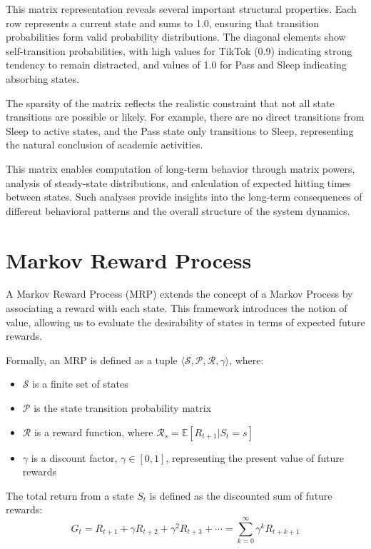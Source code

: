 This matrix representation reveals several important structural properties. Each row represents a current state and sums to 1.0, ensuring that transition probabilities form valid probability distributions. The diagonal elements show self-transition probabilities, with high values for TikTok (0.9) indicating strong tendency to remain distracted, and values of 1.0 for Pass and Sleep indicating absorbing states.

The sparsity of the matrix reflects the realistic constraint that not all state transitions are possible or likely. For example, there are no direct transitions from Sleep to active states, and the Pass state only transitions to Sleep, representing the natural conclusion of academic activities.

This matrix enables computation of long-term behavior through matrix powers, analysis of steady-state distributions, and calculation of expected hitting times between states. Such analyses provide insights into the long-term consequences of different behavioral patterns and the overall structure of the system dynamics.


\section{Markov Reward Process}


A Markov Reward Process (MRP) extends the concept of a Markov Process by associating a reward with each state. This framework introduces the notion of value, allowing us to evaluate the desirability of states in terms of expected future rewards.

Formally, an MRP is defined as a tuple $\langle \mathcal{S}, \mathcal{P}, \mathcal{R}, \gamma \rangle$, where:
\begin{itemize}
    \item $\mathcal{S}$ is a finite set of states
    \item $\mathcal{P}$ is the state transition probability matrix
    \item $\mathcal{R}$ is a reward function, where $\mathcal{R}_s = \mathbb{E}[R_{t+1} | S_t = s]$
    \item $\gamma$ is a discount factor, $\gamma \in [0,1]$, representing the present value of future rewards
\end{itemize}

The total return from a state $S_t$ is defined as the discounted sum of future rewards:
\begin{equation}
G_t = R_{t+1} + \gamma R_{t+2} + \gamma^2 R_{t+3} + \cdots
= \sum_{k=0}^{\infty} \gamma^k R_{t+k+1}
\end{equation}

